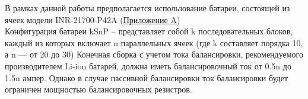 
В рамках данной работы предполагается использование батареи, состоящей из ячеек модели
INR-21700-P42A (\hyperref[app:INR21700]{Приложение A}) \\
Конфигурация батареи kSnP -- представляет собой k последовательных блоков, \\
каждый из которых включает n параллельных ячеек (где k составляет порядка 10, а n — от 20 до 30)
Конечная сборка с учетом тока балансировки, рекомендуемого производителем Li-ion батарей, должна иметь балансировочный ток от 0.5n до 1.5n ампер. 
Однако в случае пассивной балансировки ток балансировки будет ограничен мощностью балансировочных резистров.